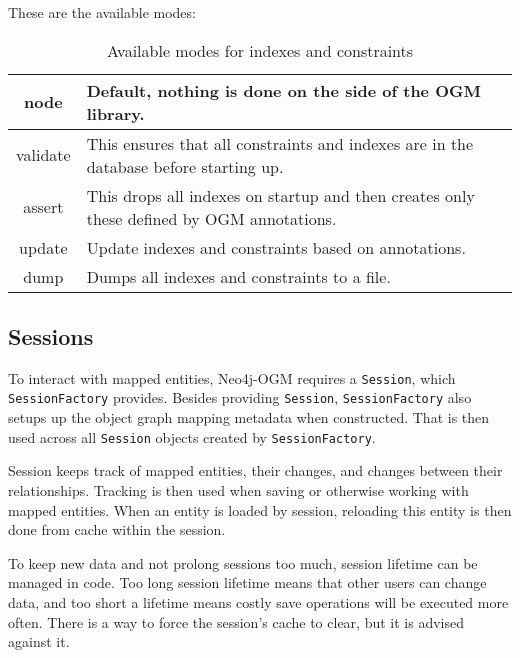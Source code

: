 These are the available modes:
\begin{table}[H]
    \begin{center}
        \begin{tabularx}{\textwidth}{|c|p{}|}
            \hline
            node     & Default, nothing is done on the side of the OGM library.                                  \\
            \hline
            validate & This ensures that all constraints and indexes are in the database before starting up.     \\
            \hline
            assert   & This drops all indexes on startup and then creates only these defined by OGM annotations. \\
            \hline
            update   & Update indexes and constraints based on annotations.                                      \\
            \hline
            dump     & Dumps all indexes and constraints to a file.                                              \\
            \hline
        \end{tabularx}
        \caption{Available modes for indexes and constraints}
    \end{center}
\end{table}

\subsection{Sessions}
To interact with mapped entities, Neo4j-OGM requires a \texttt{Session}, which \texttt{SessionFactory} provides. Besides providing \texttt{Session}, \texttt{SessionFactory}
also setups up the object graph mapping metadata when constructed. That is then used across all \texttt{Session} objects created by \texttt{SessionFactory}.

Session keeps track of mapped entities, their changes, and changes between their relationships. Tracking is then used when saving or otherwise
working with mapped entities. When an entity is loaded by session, reloading this entity is then done from cache within the session.

To keep new data and not prolong sessions too much, session lifetime can be managed in code. Too long session lifetime
means that other users can change data, and too short a lifetime means costly save operations will be executed more often. There is a way
to force the session's cache to clear, but it is advised against it.

